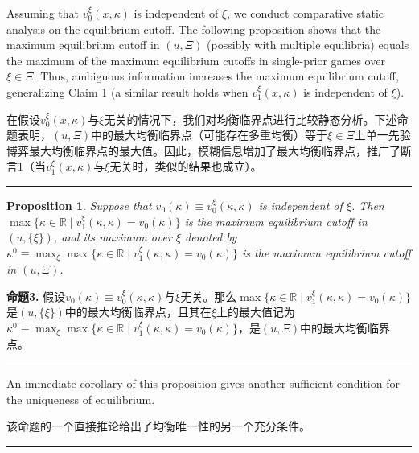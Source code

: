 \documentclass[12pt,a4paper]{article}
\newenvironment{original}
  {\par\medskip\noindent\color{black}\ignorespaces}
  {\par\medskip}
\newenvironment{translation}
  {\par\noindent\color{darkblue}\ignorespaces}
  {\par\medskip\noindent\hrule\par\medskip}
\newtheorem{proposition}[theorem]{Proposition}
\theoremstyle{definition}
\theoremstyle{remark}
\begin{document}
\begin{original}
Assuming that $v_0^\xi(x, \kappa)$ is independent of $\xi$, we conduct comparative static analysis on the equilibrium cutoff. The following proposition shows that the maximum equilibrium cutoff in $(u, \Xi)$ (possibly with multiple equilibria) equals the maximum of the maximum equilibrium cutoffs in single-prior games over $\xi \in \Xi$. Thus, ambiguous information increases the maximum equilibrium cutoff, generalizing Claim 1 (a similar result holds when $v_1^\xi(x, \kappa)$ is independent of $\xi$).
\end{original}
\begin{translation}
在假设$v_0^\xi(x, \kappa)$与$\xi$无关的情况下，我们对均衡临界点进行比较静态分析。下述命题表明，$(u, \Xi)$中的最大均衡临界点（可能存在多重均衡）等于$\xi \in \Xi$上单一先验博弈最大均衡临界点的最大值。因此，模糊信息增加了最大均衡临界点，推广了断言1（当$v_1^\xi(x, \kappa)$与$\xi$无关时，类似的结果也成立）。
\end{translation}

\begin{proposition}
Suppose that $v_0(\kappa) \equiv v_0^\xi(\kappa, \kappa)$ is independent of $\xi$. Then $\max\{\kappa \in \mathbb{R} \mid v_1^\xi(\kappa, \kappa) = v_0(\kappa)\}$ is the maximum equilibrium cutoff in $(u, \{\xi\})$, and its maximum over $\xi$ denoted by $\kappa^0 \equiv \max_{\xi} \max\{\kappa \in \mathbb{R} \mid v_1^\xi(\kappa, \kappa) = v_0(\kappa)\}$ is the maximum equilibrium cutoff in $(u, \Xi)$.
\end{proposition}
\begin{translation}
\color{darkblue}\textbf{命题3.} 假设$v_0(\kappa) \equiv v_0^\xi(\kappa, \kappa)$与$\xi$无关。那么$\max\{\kappa \in \mathbb{R} \mid v_1^\xi(\kappa, \kappa) = v_0(\kappa)\}$是$(u, \{\xi\})$中的最大均衡临界点，且其在$\xi$上的最大值记为$\kappa^0 \equiv \max_{\xi} \max\{\kappa \in \mathbb{R} \mid v_1^\xi(\kappa, \kappa) = v_0(\kappa)\}$，是$(u, \Xi)$中的最大均衡临界点。
\end{translation}

\begin{original}
An immediate corollary of this proposition gives another sufficient condition for the uniqueness of equilibrium.
\end{original}
\begin{translation}
该命题的一个直接推论给出了均衡唯一性的另一个充分条件。
\end{translation}
\end{document}
